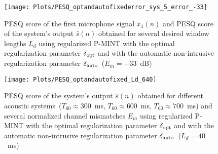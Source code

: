 \documentclass[draftcls,onecolumn,11pt]{IEEEtran}
\begin{document}
\begin{figure}[h]
\centering
\texttt{[image: Plots/PESQ\_optandautofixederror\_sys\_5\_error\_-33]}
\caption{PESQ score of the first microphone signal $x_1(n)$ and PESQ score of the system's output $\hat{s}(n)$ obtained for several desired window lengths $L_d$ using regularized P-MINT with the optimal regularization parameter $\delta_{\rm opt}$ and with the automatic non-intrusive regularization parameter $\delta_{\rm auto}$~($E_m = -33$~dB)}
\label{fig: autopesq1}
\end{figure}
\begin{figure}[h]
\centering
\texttt{[image: Plots/PESQ\_optandautofixed\_Ld\_640]}
\caption{PESQ score of the system's output $\hat{s}(n)$ obtained for different acoustic systems~($T_{60} \approx 300$~ms, $T_{60} \approx 600$~ms, $T_{60} \approx 700$~ms) and several normalized channel mismatches $E_m$ using regularized P-MINT with the optimal regularization parameter $\delta_{\rm opt}$ and with the automatic non-intrusive regularization parameter $\delta_{\rm auto}$~($L_d = 40$~ms)}
\label{fig: autopesq2}
\end{figure}





\end{document}
